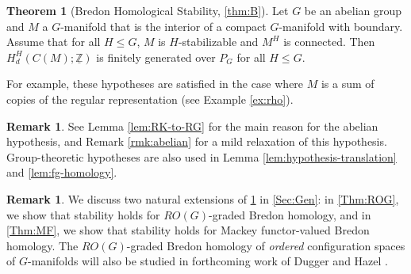 \documentclass[11pt]{amsart}
\theoremstyle{definition}
\newtheorem{remark}[equation]{Remark}
\numberwithin{equation}{subsection} %
\newtheorem{thmx}{Theorem}
\def\z{\mathbb{Z}}
\def\uM{\underline{M}}
\def\uM{\underline{M}}
\newcommand{\Z}{\mathbb{Z}}
\begin{document}

\begin{thmx}[{Bredon Homological Stability, \cref{thm:B}}]\label{MT:Stability}
Let $G$ be an abelian group and $M$ a $G$-manifold that is the interior of a
compact $G$-manifold with boundary. Assume that for all $H\leq G$, $M$ is
$H$-stabilizable and $M^H$ is connected.
Then $H_d^H(C(M);\underline{\Z})$ is finitely generated over $P_G$ for all $H\leq G$.
\end{thmx}
For example, these hypotheses are satisfied in the case where $M$ is a sum of
copies of the regular representation (see Example \ref{ex:rho}).

\begin{remark}
See Lemma \ref{lem:RK-to-RG} for the main reason for the abelian hypothesis, and
Remark \ref{rmk:abelian} for a mild relaxation of this hypothesis.
Group-theoretic hypotheses are also used in Lemma
\ref{lem:hypothesis-translation} and \ref{lem:fg-homology}.
\end{remark}

\begin{remark}
We discuss two natural extensions of \cref{MT:Stability} in \cref{Sec:Gen}: in \cref{Thm:ROG}, we show that stability holds for $RO(G)$-graded Bredon homology, and in \cref{Thm:MF}, we show that stability holds for Mackey functor-valued Bredon homology. The $RO(G)$-graded Bredon homology of \emph{ordered} configuration spaces of $G$-manifolds will also be studied in forthcoming work of Dugger and Hazel \cite{DH23}. 
\end{remark}

\end{document}
